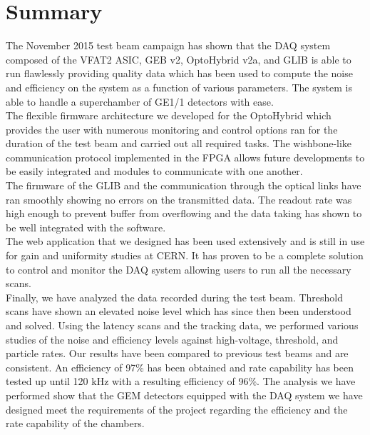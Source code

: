 \chapter{Summary}
\label{chap:II-7-summary}

The November 2015 test beam campaign has shown that the DAQ system composed of the VFAT2 ASIC, GEB v2, OptoHybrid v2a, and GLIB is able to run flawlessly providing quality data which has been used to compute the noise and efficiency on the system as a function of various parameters. The system is able to handle a superchamber of GE1/1 detectors with ease. \\

The flexible firmware architecture we developed for the OptoHybrid which provides the user with numerous monitoring and control options ran for the duration of the test beam and carried out all required tasks. The wishbone-like communication protocol implemented in the FPGA allows future developments to be easily integrated and modules to communicate with one another. \\

The firmware of the GLIB and the communication through the optical links have ran smoothly showing no errors on the transmitted data. The readout rate was high enough to prevent buffer from overflowing and the data taking has shown to be well integrated with the software. \\

The web application that we designed has been used extensively and is still in use for gain and uniformity studies at CERN. It has proven to be a complete solution to control and monitor the DAQ system allowing users to run all the necessary scans. \\

Finally, we have analyzed the data recorded during the test beam. Threshold scans have shown an elevated noise level which has since then been understood and solved. Using the latency scans and the tracking data, we performed various studies of the noise and efficiency levels against high-voltage, threshold, and particle rates. Our results have been compared to previous test beams and are consistent. An efficiency of 97\% has been obtained and rate capability has been tested up until 120 kHz with a resulting efficiency of 96\%. The analysis we have performed show that the GEM detectors equipped with the DAQ system we have designed meet the requirements of the project regarding the efficiency and the rate capability of the chambers.





